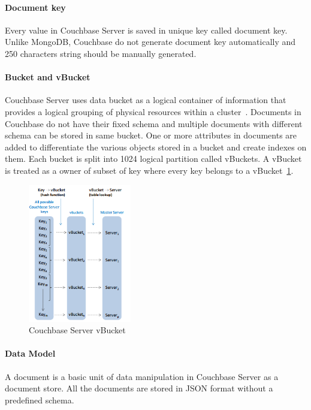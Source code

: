 \paragraph{Document key}
Every value in Couchbase Server is saved in unique key called document key. Unlike MongoDB, Couchbase  do not generate document key automatically and 250 characters string should be manually generated.

\paragraph{Bucket and vBucket}
Couchbase Server uses data bucket as a logical container of information that provides a logical grouping of physical resources within a cluster~\citep{lichtenberg2013nosql}. Documents in Couchbase do not have their fixed schema and multiple documents  with different schema can be stored in same bucket. One or more attributes in documents are added to differentiate the various objects stored in a bucket and create indexes on them. Each bucket is split into 1024 logical partition called vBuckets. A vBucket is treated as a owner of subset of key where every key belongs to a vBucket~\ref{fig:cb-vbucket}.  

\begin{figure}[H]
	\centering
	\includegraphics[width=0.4\textwidth]{img/vbucket2}
	\caption{ Couchbase Server vBucket ~\cite{couchbasedocs}}
	\label{fig:cb-vbucket}
\end{figure}

\paragraph{Data Model}%
A document is a basic unit of data manipulation in Couchbase Server as a document store. All the documents are stored in JSON format without a predefined schema.

